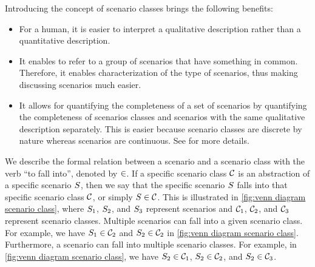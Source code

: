 Introducing the concept of scenario classes brings the following benefits:
\begin{itemize}
	\item For a human, it is easier to interpret a qualitative description rather than a quantitative description.
	\item It enables to refer to a group of scenarios that have something in common. Therefore, it enables characterization of the type of scenarios, thus making discussing scenarios much easier.
	\cbstartd
	\item It allows for quantifying the completeness of a set of scenarios by quantifying the completeness of scenarios classes and scenarios with the same qualitative description separately. This is easier because scenario classes are discrete by nature whereas scenarios are continuous. See \cite{degelder2019completeness} for more details.
	\cbend
\end{itemize}

We describe the formal relation between a scenario and a scenario class with the verb ``to fall into'', denoted by $\in$. If a specific scenario class $\mathcal{C}$ is an abstraction of a specific scenario $S$, then we say that the specific scenario $S$ falls into that specific scenario class $\mathcal{C}$, or simply $S \in \mathcal{C}$. \cbstartc This is illustrated in \cref{fig:venn diagram scenario class}, where $S_{1}$, $S_{2}$, and $S_{3}$ represent scenarios and $\mathcal{C}_{1}$, $\mathcal{C}_{2}$, and $\mathcal{C}_{3}$ represent scenario classes. Multiple scenarios can fall into a given scenario class. For example, we have $S_{1} \in \mathcal{C}_{2}$ and $S_{2} \in \mathcal{C}_{2}$ in \cref{fig:venn diagram scenario class}. 
Furthermore, a scenario can fall into multiple scenario classes. For example, in \cref{fig:venn diagram scenario class}, we have $S_{2} \in \mathcal{C}_{1}$, $S_{2} \in \mathcal{C}_{2}$, and $S_{2} \in \mathcal{C}_{3}$.
\cbend

